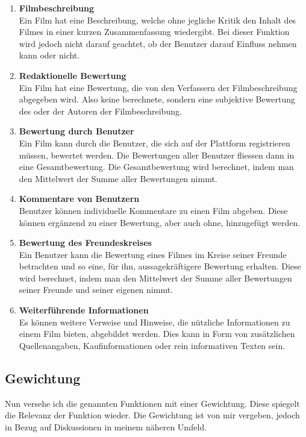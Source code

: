 \begin{enumerate}
    \item \textbf{Filmbeschreibung}\\
          Ein Film hat eine Beschreibung, welche ohne jegliche Kritik den Inhalt
          des Filmes in einer kurzen Zusammenfassung wiedergibt. Bei dieser Funktion
          wird jedoch nicht darauf geachtet, ob der Benutzer darauf Einfluss nehmen
          kann oder nicht.
    \item \textbf{Redaktionelle Bewertung}\\
          Ein Film hat eine Bewertung, die von den Verfassern der Filmbeschreibung 
          abgegeben wird. Also keine berechnete, sondern eine subjektive Bewertung
          des oder der Autoren der Filmbeschreibung.
    \item \textbf{Bewertung durch Benutzer}\\
          Ein Film kann durch die Benutzer, die sich auf der Plattform
          registrieren müssen, bewertet werden. Die Bewertungen aller Benutzer
          fliessen dann in eine Gesamtbewertung. Die Gesamtbewertung wird berechnet,
          indem man den Mittelwert der Summe aller Bewertungen nimmt.
    \item \textbf{Kommentare von Benutzern}\\
          Benutzer können individuelle Kommentare zu einen Film abgeben. Diese
          können ergänzend zu einer Bewertung, aber auch ohne, hinzugefügt werden.
    \item \textbf{Bewertung des Freundeskreises}\\
          Ein Benutzer kann die Bewertung eines Filmes im Kreise seiner Freunde
          betrachten und so eine, für ihn, aussagekräftigere Bewertung erhalten.
          Diese wird berechnet, indem man den Mittelwert der Summe aller Bewertungen
          seiner Freunde und seiner eigenen nimmt.
    \item \textbf{Weiterführende Informationen}\\
          Es können weitere Verweise und Hinweise, die nützliche Informationen
          zu einem Film bieten, abgebildet werden. Dies kann in Form von zusätzlichen
          Quellenangaben, Kaufinformationen oder rein informativen Texten sein.
\end{enumerate}

\subsection{Gewichtung}
Nun versehe ich die genannten Funktionen mit einer Gewichtung. Diese spiegelt die
Relevanz der Funktion wieder. Die Gewichtung ist von mir vergeben, jedoch in Bezug
auf Diskussionen in meinem näheren Umfeld.

